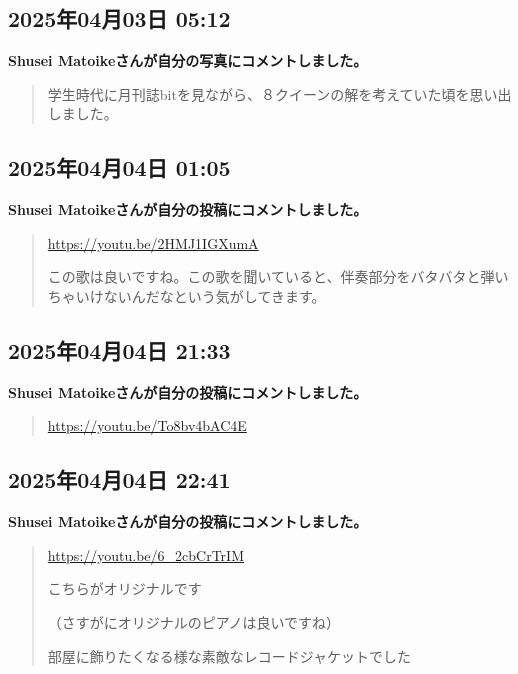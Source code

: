 \subsection*{2025年04月03日 05:12}

\textbf{Shusei Matoikeさんが自分の写真にコメントしました。}

\begin{quote}
学生時代に月刊誌bitを見ながら、８クイーンの解を考えていた頃を思い出しました。
\end{quote}

\subsection*{2025年04月04日 01:05}

\textbf{Shusei Matoikeさんが自分の投稿にコメントしました。}

\begin{quote}
\url{https://youtu.be/2HMJ1IGXumA}

この歌は良いですね。この歌を聞いていると、伴奏部分をバタバタと弾いちゃいけないんだなという気がしてきます。
\end{quote}

\subsection*{2025年04月04日 21:33}

\textbf{Shusei Matoikeさんが自分の投稿にコメントしました。}

\begin{quote}
\url{https://youtu.be/To8bv4bAC4E}
\end{quote}

\subsection*{2025年04月04日 22:41}

\textbf{Shusei Matoikeさんが自分の投稿にコメントしました。}

\begin{quote}
\url{https://youtu.be/6_2cbCrTrIM}

こちらがオリジナルです

（さすがにオリジナルのピアノは良いですね）

部屋に飾りたくなる様な素敵なレコードジャケットでした
\end{quote}

